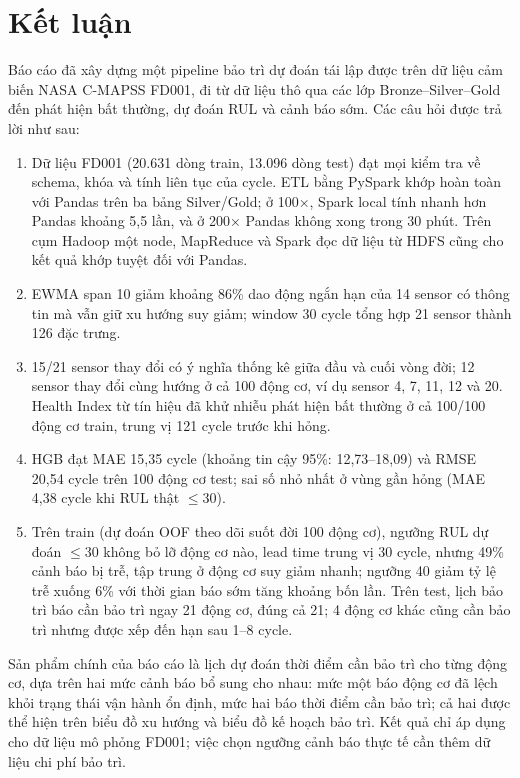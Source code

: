 \section{Kết luận}
\label{sec:conclusion}

Báo cáo đã xây dựng một pipeline bảo trì dự đoán tái lập được trên dữ liệu cảm
biến NASA C-MAPSS FD001, đi từ dữ liệu thô qua các lớp Bronze--Silver--Gold đến
phát hiện bất thường, dự đoán RUL và cảnh báo sớm. Các câu hỏi được trả lời như
sau:
\begin{enumerate}[label=\textbf{Q\arabic*.},leftmargin=2.6em]
\item Dữ liệu FD001 (20.631 dòng train, 13.096 dòng test) đạt mọi kiểm tra về
      schema, khóa và tính liên tục của cycle. ETL bằng PySpark khớp hoàn toàn với
      Pandas trên ba bảng Silver/Gold; ở 100×, Spark local tính nhanh hơn Pandas
      khoảng 5,5 lần, và ở 200× Pandas không xong trong 30 phút. Trên cụm Hadoop một node, MapReduce và Spark đọc dữ
      liệu từ HDFS cũng cho kết quả khớp tuyệt đối với Pandas.
\item EWMA span 10 giảm khoảng 86\% dao động ngắn hạn của 14 sensor có thông tin
      mà vẫn giữ xu hướng suy giảm; window 30 cycle tổng hợp 21 sensor thành 126
      đặc trưng.
\item 15/21 sensor thay đổi có ý nghĩa thống kê giữa đầu và cuối vòng đời; 12
      sensor thay đổi cùng hướng ở cả 100 động cơ, ví dụ sensor 4, 7, 11, 12 và 20. Health Index
      từ tín hiệu đã khử nhiễu phát hiện bất thường ở cả 100/100 động cơ train, trung
      vị 121 cycle trước khi hỏng.
\item HGB đạt MAE 15,35 cycle (khoảng tin cậy 95\%: 12,73--18,09)
      và RMSE 20,54 cycle trên 100 động cơ test; sai số nhỏ nhất ở vùng gần hỏng
      (MAE 4,38 cycle khi RUL thật $\leq30$).
\item Trên train (dự đoán OOF theo dõi suốt đời 100 động cơ), ngưỡng RUL dự đoán
      $\leq30$ không bỏ lỡ động cơ nào, lead time trung vị 30 cycle, nhưng 49\%
      cảnh báo bị trễ, tập trung ở động cơ suy giảm nhanh; ngưỡng 40 giảm tỷ lệ trễ
      xuống 6\% với thời gian báo sớm tăng khoảng bốn lần. Trên test, lịch bảo trì
      báo cần bảo trì ngay 21 động cơ, đúng cả 21; 4 động cơ khác cũng cần bảo trì
      nhưng được xếp đến hạn sau 1--8 cycle.
\end{enumerate}

Sản phẩm chính của báo cáo là lịch dự đoán thời điểm cần bảo trì cho từng động
cơ, dựa trên hai mức cảnh báo bổ sung cho nhau: mức một báo động cơ đã lệch khỏi
trạng thái vận hành ổn định, mức hai báo thời điểm cần bảo trì; cả hai được thể hiện trên biểu đồ xu
hướng và biểu đồ kế hoạch bảo trì. Kết quả chỉ áp dụng cho dữ liệu mô phỏng FD001; việc chọn ngưỡng cảnh báo thực tế cần thêm dữ liệu chi phí bảo trì.
